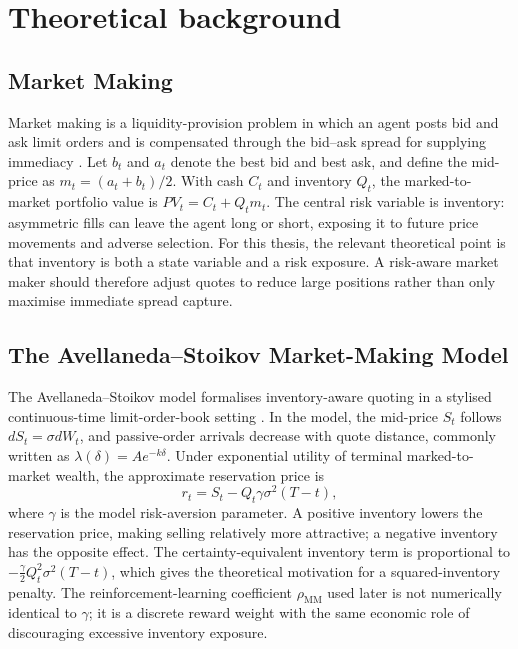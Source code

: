 \documentclass[oneside]{uva-inf-bachelor-thesis}
\begin{document}
\chapter{Theoretical background}
\label{chap:technical_background}

\section{Market Making}
\label{sec:market_making}

Market making is a liquidity-provision problem in which an agent posts bid and ask
limit orders and is compensated through the bid--ask spread for supplying immediacy
\cite{garman_market_1976,ho_optimal_1981}. Let \(b_t\) and \(a_t\) denote the best
bid and best ask, and define the mid-price as \(m_t=(a_t+b_t)/2\). With cash \(C_t\)
and inventory \(Q_t\), the marked-to-market portfolio value is \(PV_t=C_t+Q_t m_t\).
The central risk variable is inventory: asymmetric fills can leave the agent long or
short, exposing it to future price movements and adverse selection. For this thesis,
the relevant theoretical point is that inventory is both a state variable and a risk
exposure. A risk-aware market maker should therefore adjust quotes to reduce large
positions rather than only maximise immediate spread capture.

\section{The Avellaneda--Stoikov Market-Making Model}
\label{sec:avellaneda_stoikov}

The Avellaneda--Stoikov model formalises inventory-aware quoting in a stylised
continuous-time limit-order-book setting \cite{avellaneda_high-frequency_2008}. In
the model, the mid-price \(S_t\) follows \(dS_t=\sigma dW_t\), and passive-order
arrivals decrease with quote distance, commonly written as
\(\lambda(\delta)=Ae^{-k\delta}\). Under exponential utility of terminal
marked-to-market wealth, the approximate reservation price is
\begin{equation}
    r_t = S_t - Q_t\gamma\sigma^2(T-t),
    \label{eq:as_reservation_price_short}
\end{equation}
where \(\gamma\) is the model risk-aversion parameter. A positive inventory lowers
the reservation price, making selling relatively more attractive; a negative inventory
has the opposite effect. The certainty-equivalent inventory term is proportional to
\(-\frac{\gamma}{2}Q_t^2\sigma^2(T-t)\), which gives the theoretical motivation for a
squared-inventory penalty. The reinforcement-learning coefficient
\(\rho_{\mathrm{MM}}\) used later is not numerically identical to \(\gamma\); it is a
discrete reward weight with the same economic role of discouraging excessive
inventory exposure.
\end{document}
